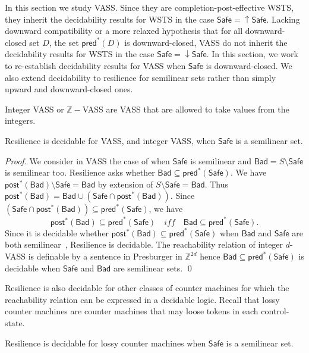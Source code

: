 \documentclass[runningheads]{llncs}
\newcommand{\pred}{\textsf{pred}}
\newcommand{\post}{\textsf{post}}
\newcommand{\Bad}{\textsf{Bad}}
\newcommand{\Safe}{\textsf{Safe}}
\begin{document}
In this section we study VASS. Since they are completion-post-effective WSTS, they inherit the decidability results for WSTS in the case 
$\Safe = \uparrow \Safe$. Lacking downward compatibility or a more relaxed hypothesis that
for all downward-closed set $D$, the set $\pred^*(D)$ is downward-closed, 
VASS do not inherit the decidability results for WSTS in the case $\Safe = \downarrow \Safe$.
In this section, we work to re-establish decidability results for VASS when $\Safe$ is downward-closed. We also extend decidability to resilience for semilinear sets rather than simply upward and downward-closed ones.

Integer VASS or $\mathbb{Z}-$VASS \cite{DBLP:conf/rp/HaaseH14} are VASS that are allowed to take values from the integers.

\begin{theorem}\label{SL VASS}
{\sc Resilience} is decidable for VASS, and integer VASS, when $\Safe$  is a semilinear set.
\end{theorem}

\begin{proof}
We consider in VASS the case of when $\Safe$ is semilinear
and $\Bad = S \setminus \Safe$ is semilinear too.
{\sc Resilience} asks whether $\Bad \subseteq \pred^*(\Safe)$.
We have $\post^*(\Bad) \setminus \Safe = \Bad$ by extension of $S \setminus \Safe = \Bad$.
Thus $\post^*(\Bad) = \Bad \cup (\Safe \cap \post^*(\Bad))$. Since $(\Safe \cap \post^*(\Bad)) \subseteq \pred^*(\Safe)$, we have
\[\post^*(\Bad) \subseteq \pred^*(\Safe) \quad iff \quad \Bad \subseteq \pred^*(\Safe).\]
Since it is decidable whether $\post^*(\Bad) \subseteq \pred^*(\Safe)$ when 
$\Bad$ and $\Safe$ are both semilinear~\cite{DBLP:journals/corr/abs-2207-02697}, 
{\sc Resilience} is decidable. 
The reachability relation of integer $d$-VASS is definable by a sentence in Presburger in $\mathbb{Z}^{2d}$ hence	$\Bad \subseteq \pred^*(\Safe)$ is decidable when $\Safe$ and $\Bad$ are semilinear sets. \qed
\end{proof}

{\sc Resilience} is also decidable for other classes of counter machines for which the reachability relation can be expressed in a decidable logic. Recall that lossy counter machines \cite{DBLP:conf/rp/Schnoebelen10} are counter machines that may loose tokens in each control-state.

\begin{theorem}\label{SL Lossy}
{\sc Resilience} is decidable for lossy counter machines when $\Safe$  is a semilinear set.
\end{theorem}
\end{document}
